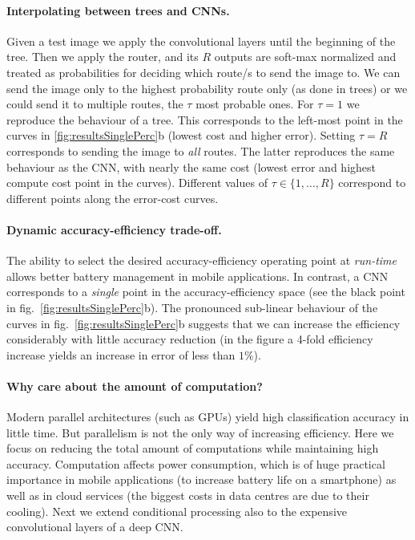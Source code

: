 \documentclass[thesis]{subfiles}
\begin{document}
	\paragraph{Interpolating between trees and CNNs.}
	Given a test image we apply the convolutional layers until the beginning of the tree. 
	Then we apply the router, and its $R$ outputs are soft-max normalized and treated 
	as probabilities for deciding which route/s to send the image to. 
	We can send the image only to the highest probability route only (as done in trees)
	or we could send it to multiple routes, \eg the $\tau$ most probable ones. 
	For $\tau=1$ we reproduce the behaviour of a tree. 
	This corresponds to the left-most point in the curves in 
	\cref{fig:resultsSinglePerc}b (lowest cost and higher error). 
	Setting $\tau=R$ corresponds to sending the image to {\em all} routes. 
	The latter reproduces the same behaviour as the CNN, with nearly the same 
	cost (lowest error and highest compute cost point in the curves).
	Different values of $\tau \in \{1,\dots,R\}$ correspond to different points along the error-cost curves.

	\paragraph{Dynamic accuracy-efficiency trade-off.}
	The ability to select the desired accuracy-efficiency operating point 
	at {\em run-time} allows \eg better battery management in mobile applications.
	In contrast, a CNN corresponds to a {\em single} point in the accuracy-efficiency space 
	(see the black point in fig.~\ref{fig:resultsSinglePerc}b). 
	The pronounced sub-linear behaviour of the curves in fig.~\ref{fig:resultsSinglePerc}b 
	suggests that we can increase the efficiency considerably with little accuracy reduction
	(in the figure a 4-fold efficiency increase yields an increase in error of less than $1\%$). 

	\paragraph{Why care about the amount of computation?}
	Modern parallel architectures (such as GPUs) yield
	high classification accuracy in little time. But parallelism is not the only way of 
	increasing efficiency. Here we focus on reducing the total amount of
	computations while maintaining high accuracy. 
	Computation affects power consumption, which is of huge practical 
	importance in mobile applications (to increase battery life on a smartphone) 
	as well as in cloud services (the biggest costs in data centres are due to their cooling).
	Next we extend conditional processing also to the expensive convolutional layers of a deep CNN.
\end{document}
